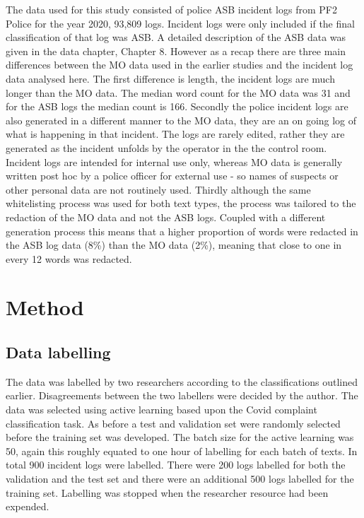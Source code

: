 The data used for this study consisted of police ASB incident logs from PF2 Police for the year 2020,  93,809 logs. Incident logs were only included if the final classification of that log was ASB. A detailed description of the ASB data was given in the data chapter, Chapter 8.  However as a recap there are three main differences between the MO data used in the earlier studies and the incident log data analysed here. The first difference is length, the incident logs are much longer than the MO data. The median word count for the MO data was 31 and for the ASB logs the median count is 166. Secondly the police incident logs are also generated in a different manner to the MO data, they are an on going log of what is happening in that incident. The logs are rarely edited, rather they are generated as the incident unfolds by the operator in the the control room.  Incident logs are intended for internal use only, whereas MO data is generally written post hoc by a police officer for external use - so names of suspects or other personal data are not routinely used. Thirdly although the same whitelisting process was used for both text types, the process was tailored to the redaction of the MO data and not the ASB logs. Coupled with a different generation process this means that a higher proportion of words were redacted in the ASB log data (8\%) than the MO data (2\%), meaning that close to one in every 12 words was redacted.

\section{Method}


\subsection{Data labelling} The data was labelled by two researchers according to the classifications outlined earlier. Disagreements between the two labellers were decided by the author. The data was selected using active learning based upon the Covid complaint classification task. As before a test and validation set were randomly selected before the training set was developed. The batch size for the active learning was 50, again this roughly equated to one hour of labelling for each batch of texts. In total 900 incident logs were labelled. There were 200 logs labelled for both the validation and the test set and there were an additional 500 logs labelled for the training set. Labelling was stopped when the researcher resource had been expended.

